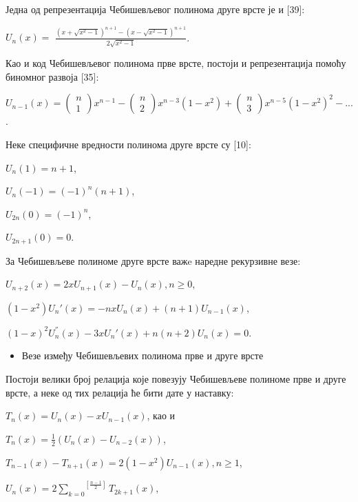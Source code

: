 Једна од репрезентација Чебишевљевог полинома друге врсте је и {[}39{]}:

\(U_{n}(x) =\)
\(\frac{{(x + \sqrt{x^{2} - 1})}^{n + 1} - {(x - \sqrt{x^{2} - 1})}^{n + 1}}{2\sqrt{x^{2} - 1}}\).

Као и код Чебишевљевог полинома прве врсте, постоји и репрезентација
помоћу биномног развоја {[}35{]}:

\(U_{n - 1}(x) = \left( \begin{array}{r}
n \\
1
\end{array} \right)x^{n - 1} - \left( \begin{array}{r}
n \\
2
\end{array} \right)x^{n - 3}(1 - x^{2}) + \left( \begin{array}{r}
n \\
3
\end{array} \right)x^{n - 5}{(1 - x^{2})}^{2} - ...\).

Неке специфичне вредности полинома друге врсте су {[}10{]}:

\(U_{n}(1) = n + 1\),

\(U_{n}( - 1) = {( - 1)}^{n}(n + 1)\),

\(U_{2n}(0) = {( - 1)}^{n}\),

\(U_{2n + 1}(0) = 0\).

За Чебишевљеве полиноме друге врсте важe наредне рекурзивне везе:

\(U_{n + 2}(x) = 2xU_{n + 1}(x) - U_{n}(x),n \geq 0\),

\((1 - x^{2})U_{n}'(x) = - nxU_{n}(x) + (n + 1)U_{n - 1}(x)\),

\({(1 - x)}^{2}U_{n}^{''}(x) - 3xU_{n}'(x) + n(n + 2)U_{n}(x) = 0\).

\begin{itemize}
\item
  Везе између Чебишевљевих полинома прве и друге врсте
\end{itemize}

Постоји велики број релација које повезују Чебишевљеве полиноме прве и
друге врсте, а неке од тих релација ће бити дате у наставку:

\(T_{n}(x) = U_{n}(x) - xU_{n - 1}(x)\), као и

\(T_{n}(x) = \frac{1}{2}(U_{n}(x) - U_{n - 2}(x))\),

\(T_{n - 1}(x) - T_{n + 1}(x) = 2(1 - x^{2})U_{n - 1}(x),n \geq 1\),

\(U_{n}(x) = 2\overset{\left\lbrack \frac{n - 1}{2} \right\rbrack}{\sum_{k = 0}}T_{2k + 1}(x)\),


